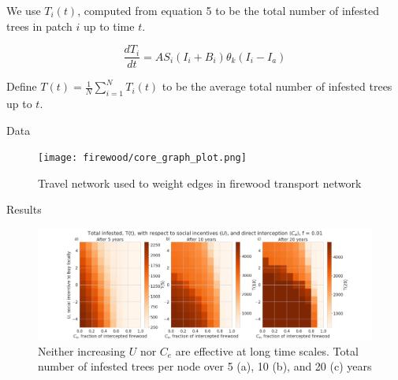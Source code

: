 \documentclass{beamer}
\begin{document}
\begin{frame}{}    

    We use $T_i(t)$, computed from equation 5 to be the total number of infested trees in patch $i$ up to time $t$. 

    \begin{equation}
        \frac{dT_i}{dt}= A S_i (I_i+ B_i)\theta_k(I_i - I_a)
        \label{sum_eqn}
    \end{equation}

    Define $T(t) = \frac{1}{N} \sum_{i=1}^N T_i(t)$ to be the average total number of infested trees up to $t$.
\end{frame}


\begin{frame}{Data}

    \begin{figure}
        \texttt{[image: firewood/core\_graph\_plot.png]}
        \caption{Travel network used to weight edges in firewood transport network}
    \end{figure}
\end{frame}


\begin{frame}{Results}
    \begin{figure}
        \includegraphics[width=\textwidth]{firewood/ct_v_ce_plane.png}
        \caption{Neither increasing $U$ nor $C_e$ are effective at long time scales. Total number of infested trees per node over 5 (a), 10 (b), and 20 (c) years}
    \end{figure}
\end{frame}
\end{document}
